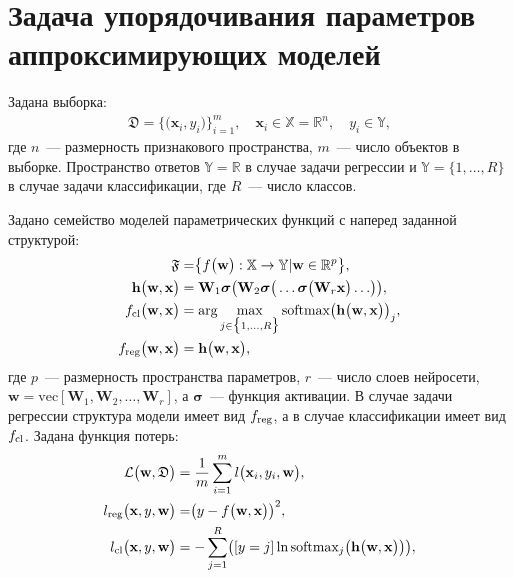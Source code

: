 \section{Задача упорядочивания параметров аппроксимирующих моделей}
Задана выборка:
\[
\label{ch-5:eq:st:1}
\begin{aligned}
\mathfrak{D} = \bigr\{\bigr(\textbf{x}_i, y_i\bigr)\bigr\}_{i=1}^{m}, \quad \textbf{x}_{i} \in \mathbb{X} = \mathbb{R}^{n}, \quad y_i \in \mathbb{Y},
\end{aligned}
\]
где $n$~--- размерность признакового пространства, $m$~--- число объектов в выборке. Пространство ответов $\mathbb{Y} = \mathbb{R}$ в случае задачи регрессии и  $\mathbb{Y} = \{1,\ldots, R\}$ в случае задачи классификации, где $R$~--- число классов.

Задано семейство моделей параметрических функций с наперед заданной структурой:
\[
\label{ch-5:eq:st:2}
\begin{aligned}
\mathfrak{F} &= \bigr\{f\bigr(\textbf{w}\bigr):\mathbb{X} \to \mathbb{Y} | \textbf{w} \in \mathbb{R}^{p}\bigr\}, \\ 
\mathbf{h}\bigr(\textbf{w}, \textbf{x}\bigr) &= \textbf{W}_1\bm{\sigma}\bigr(\textbf{W}_2\bm{\sigma}\bigr(\ldots\bm{\sigma}\bigr(\textbf{W}_r\textbf{x}\bigr)\ldots\bigr)\bigr),\\
f_{\text{\text{cl}}}\bigr(\textbf{w}, \textbf{x}\bigr) &= \arg \max_{j \in \bigr\{1,\ldots, R\bigr\}} \text{softmax}\bigr(\mathbf{h}\bigr(\textbf{w}, \textbf{x}\bigr)\bigr)_{j}, \\ 
f_{\text{reg}}\bigr(\textbf{w}, \textbf{x}\bigr) & = \mathbf{h}\bigr(\textbf{w}, \textbf{x}\bigr), 
\end{aligned}
\]
где $p$~--- размерность пространства параметров, $r$~--- число слоев нейросети, $\textbf{w} = \text{vec}[\textbf{W}_1, \textbf{W}_2, \ldots, \textbf{W}_r]$, а $\bm{\sigma}$~--- функция активации. В случае задачи регрессии структура модели имеет вид $f_{\text{\text{reg}}}$, а в случае классификации имеет вид $f_{\text{\text{cl}}}$.
Задана функция потерь:
\[
\label{ch-5:eq:st:3}
\begin{aligned}
\mathcal{L}\bigr(\textbf{w}, \mathfrak{D}\bigr) &= \frac{1}{m}\sum_{i=1}^{m}l\bigr(\textbf{x}_{i}, y_i, \textbf{w}\bigr),\\
l_{\text{\text{reg}}}\bigr(\textbf{x}, y, \textbf{w}\bigr) &= \bigr(y - f\bigr(\textbf{w}, \textbf{x}\bigr)\bigr)^{2},\\
l_{\text{\text{cl}}}\bigr(\textbf{x}, y, \textbf{w}\bigr) &= -\sum_{j=1}^{R}\bigr([y = j]\ln\text{softmax}_j\bigr(\mathbf{h}\bigr(\textbf{w}, \textbf{x}\bigr)\bigr)\bigr),
\end{aligned}
\]
